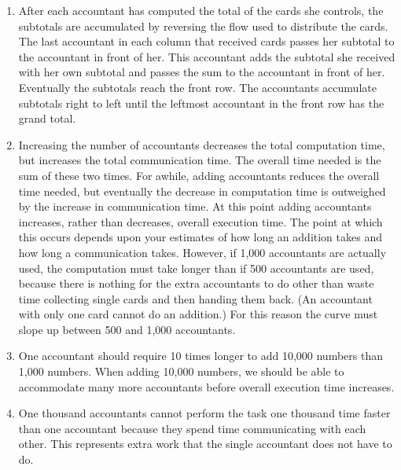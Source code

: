 \begin{enumerate}
\begin{enumerate}
\item After each accountant has computed the total of the cards she controls,
      the subtotals are accumulated by reversing the flow used to distribute
      the cards. The last accountant in each column that received cards passes
      her subtotal to the accountant in front of her. This accountant adds the
      subtotal she received with her own subtotal and passes the sum to the
      accountant in front of her. Eventually the subtotals reach the front row.
      The accountants accumulate subtotals right to left until the leftmost
      accountant in the front row has the grand total.

\item Increasing the number of accountants decreases the total computation
      time, but increases the total communication time. The overall time
      needed is the sum of these two times. For awhile, adding accountants
      reduces the overall time needed, but eventually the decrease in
      computation time is outweighed by the increase in communication time.
      At this point adding accountants increases, rather than decreases,
      overall execution time. The point at which this occurs depends upon your
      estimates of how long an addition takes and how long a communication
      takes.
      However, if 1,000 accountants are actually used,
      the computation must take longer than if 500 accountants are
      used, because there is nothing for the extra accountants to do
      other than waste time collecting single cards and then handing
      them back.
      (An accountant with only one card cannot do an addition.)
      For this reason the curve must slope up between
      500 and 1,000 accountants.

\item One accountant should require 10 times longer to add 10,000 numbers than
      1,000 numbers. When adding 10,000 numbers, we should be able to 
      accommodate many more accountants before overall execution time
      increases.

\item One thousand accountants cannot perform the task one thousand time
      faster than one accountant because they spend time communicating with
      each other. This represents extra work that the single accountant
      does not have to do.

\end{enumerate}


\end{enumerate}
